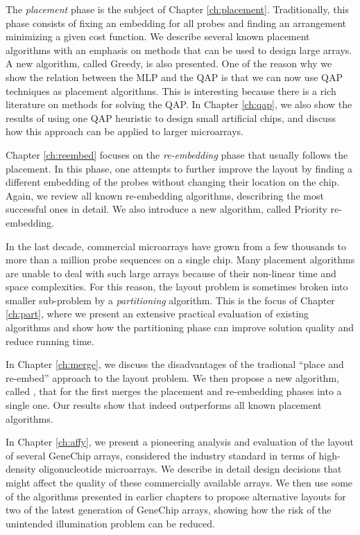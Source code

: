 The \emph{placement} phase is the subject of Chapter \ref{ch:placement}.
Traditionally, this phase consists of fixing an embedding for all probes and
finding an arrangement minimizing a given cost function. We describe several
known placement algorithms with an emphasis on methods that can be used to
design large arrays. A new algorithm, called Greedy, is also presented. One of
the reason why we show the relation between the MLP and the QAP is that we can
now use QAP techniques as placement algorithms. This is interesting because
there is a rich literature on methods for solving the QAP. In Chapter
\ref{ch:qap}, we also show the results of using one QAP heuristic to design
small artificial chips, and discuss how this approach can be applied to larger
microarrays.

Chapter \ref{ch:reembed} focuses on the \emph{re-embedding} phase that usually
follows the placement. In this phase, one attempts to further improve the layout
by finding a different embedding of the probes without changing their location
on the chip. Again, we review all known re-embedding algorithms, describring the
most successful ones in detail. We also introduce a new algorithm, called
Priority re-embedding.

In the last decade, commercial microarrays have grown from a few thousands to
more than a million probe sequences on a single chip. Many placement algorithms
are unable to deal with such large arrays because of their non-linear time and
space complexities. For this reason, the layout problem is sometimes broken into
smaller sub-problem by a \emph{partitioning} algorithm. This is the focus of
Chapter \ref{ch:part}, where we present an extensive practical evaluation of
existing algorithms and show how the partitioning phase can improve solution
quality and reduce running time.

In Chapter \ref{ch:merge}, we discuss the disadvantages of the tradional ``place
and re-embed'' approach to the layout problem. We then propose a new algorithm,
called \Greedyplus, that for the first merges the placement and re-embedding
phases into a single one. Our results show that \Greedyplus indeed outperforms
all known placement algorithms.

In Chapter \ref{ch:affy}, we present a pioneering analysis and evaluation of the
layout of several GeneChip arrays, considered the industry standard in terms of
high-density oligonucleotide microarrays. We describe in detail design decisions
that might affect the quality of these commercially available arrays. We then
use some of the algorithms presented in earlier chapters to propose alternative
layouts for two of the latest generation of GeneChip arrays, showing how the
risk of the unintended illumination problem can be reduced.

